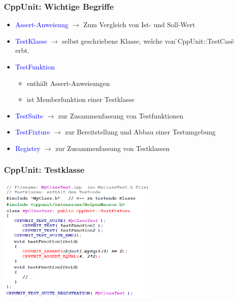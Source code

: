 \begin{multicols}{2}
\subsubsection{CppUnit: Wichtige Begriffe}
\begin{minipage}{8cm}
	\footnotesize{
	\begin{itemize}
		\item \textcolor{blue}{Assert-Anweisung} \newline $\rightarrow$ Zum Vergleich von Ist- und Soll-Wert
		\item \textcolor{blue}{TestKlasse} \newline $\rightarrow$ selbst geschriebene Klasse, \newline
        welche von \"{}CppUnit::TestCase\"{} erbt.
		\item \textcolor{blue}{TestFunktion} \begin{itemize}
			\item enthält Assert-Anweisungen
			\item ist Memberfunktion einer Testklasse
		\end{itemize}
		\item \textcolor{blue}{TestSuite} \newline $\rightarrow$ zur Zusammenfassung von Testfunktionen
		\item \textcolor{blue}{TestFixture} \newline $\rightarrow$ zur Bereitstellung und Abbau einer Testumgebung
		\item \textcolor{blue}{Registry} \newline $\rightarrow$ zur Zusammenfassung von Testklassen
	\end{itemize}}
\end{minipage}
\subsubsection{CppUnit: Testklasse}
\hspace{0.5cm}
\includegraphics[width = 8cm]{images/testklasse}

\end{multicols}
